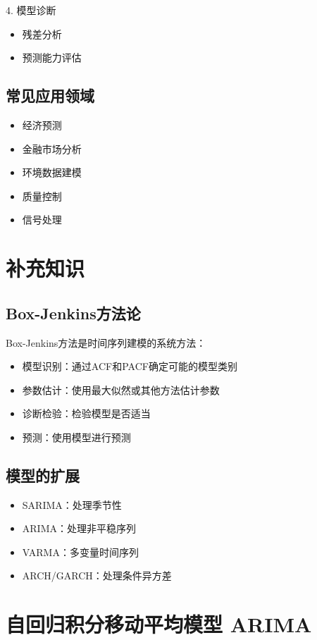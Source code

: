 4. 模型诊断
   \begin{itemize}
       \item 残差分析
       \item 预测能力评估
   \end{itemize}

\subsection{常见应用领域}
\begin{itemize}
    \item 经济预测
    \item 金融市场分析
    \item 环境数据建模
    \item 质量控制
    \item 信号处理
\end{itemize}

\section{补充知识}
\subsection{Box-Jenkins方法论}
Box-Jenkins方法是时间序列建模的系统方法：
\begin{itemize}
    \item 模型识别：通过ACF和PACF确定可能的模型类别
    \item 参数估计：使用最大似然或其他方法估计参数
    \item 诊断检验：检验模型是否适当
    \item 预测：使用模型进行预测
\end{itemize}

\subsection{模型的扩展}
\begin{itemize}
    \item SARIMA：处理季节性
    \item ARIMA：处理非平稳序列
    \item VARMA：多变量时间序列
    \item ARCH/GARCH：处理条件异方差
\end{itemize}




\section{自回归积分移动平均模型 ARIMA}
